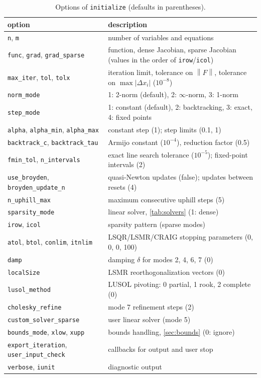 \documentclass[11pt]{article}
\newcommand{\norm}[1]{\left\lVert #1 \right\rVert}
\newcommand{\code}[1]{\texttt{#1}}
\begin{document}
\begin{table}[h]
\centering
\caption{Options of \code{initialize} (defaults in parentheses).}
\label{tab:options}
\small
\begin{tabular}{@{}p{}p{}@{}}
\toprule
option & description \\
\midrule
\code{n}, \code{m} & number of variables and equations \\
\code{func}, \code{grad}, \code{grad\_sparse} & function, dense Jacobian, sparse Jacobian (values in the order of \code{irow}/\code{icol}) \\
\code{max\_iter}, \code{tol}, \code{tolx} & iteration limit, tolerance on $\norm{F}$, tolerance on $\max|\Delta x_i|$ ($10^{-8}$) \\
\code{norm\_mode} & 1: 2-norm (default), 2: $\infty$-norm, 3: 1-norm \\
\code{step\_mode} & 1: constant (default), 2: backtracking, 3: exact, 4: fixed points \\
\code{alpha}, \code{alpha\_min}, \code{alpha\_max} & constant step (1); step limits (0.1, 1) \\
\code{backtrack\_c}, \code{backtrack\_tau} & Armijo constant ($10^{-4}$), reduction factor (0.5) \\
\code{fmin\_tol}, \code{n\_intervals} & exact line search tolerance ($10^{-5}$); fixed-point intervals (2) \\
\code{use\_broyden}, \code{broyden\_update\_n} & quasi-Newton updates (false); updates between resets (4) \\
\code{n\_uphill\_max} & maximum consecutive uphill steps (5) \\
\code{sparsity\_mode} & linear solver, \cref{tab:solvers} (1: dense) \\
\code{irow}, \code{icol} & sparsity pattern (sparse modes) \\
\code{atol}, \code{btol}, \code{conlim}, \code{itnlim} & LSQR/LSMR/CRAIG stopping parameters (0, 0, 0, 100) \\
\code{damp} & damping $\delta$ for modes 2, 4, 6, 7 (0) \\
\code{localSize} & LSMR reorthogonalization vectors (0) \\
\code{lusol\_method} & LUSOL pivoting: 0 partial, 1 rook, 2 complete (0) \\
\code{cholesky\_refine} & mode 7 refinement steps (2) \\
\code{custom\_solver\_sparse} & user linear solver (mode 5) \\
\code{bounds\_mode}, \code{xlow}, \code{xupp} & bounds handling, \cref{sec:bounds} (0: ignore) \\
\code{export\_iteration}, \code{user\_input\_check} & callbacks for output and user stop \\
\code{verbose}, \code{iunit} & diagnostic output \\
\bottomrule
\end{tabular}
\end{table}
\end{document}
